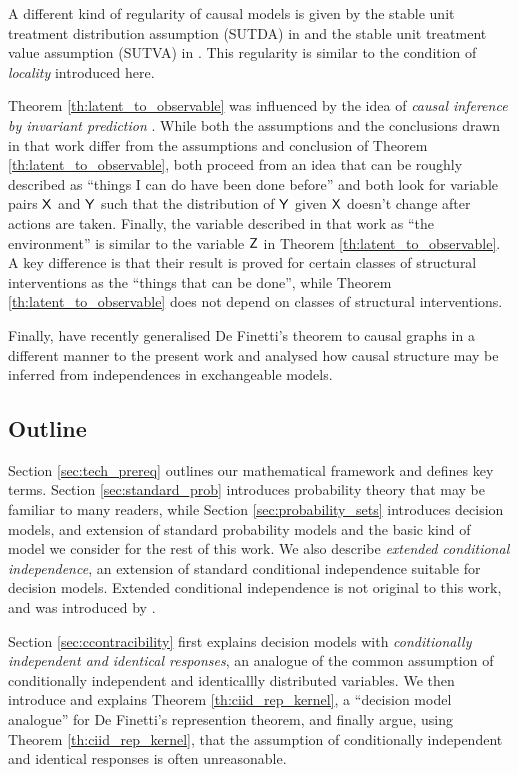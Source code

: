 \documentclass{article}
\begin{document}
A different kind of regularity of causal models is given by the stable unit treatment distribution assumption (SUTDA) in \citet{dawid_decision-theoretic_2020} and the stable unit treatment value assumption (SUTVA) in \citep{rubin_causal_2005}. This regularity is similar to the condition of \emph{locality} introduced here.

Theorem \ref{th:latent_to_observable} was influenced by the idea of \emph{causal inference by invariant prediction} \citep{peters_causal_2016}. While both the assumptions and the conclusions drawn in that work differ from the assumptions and conclusion of Theorem \ref{th:latent_to_observable}, both proceed from an idea that can be roughly described as ``things I can do have been done before'' and both look for variable pairs $\mathsf{X}$ and $\mathsf{Y}$ such that the distribution of $\mathsf{Y}$ given $\mathsf{X}$ doesn't change after actions are taken. Finally, the variable described in that work as ``the environment'' is similar to the variable $\mathsf{Z}$ in Theorem \ref{th:latent_to_observable}. A key difference is that their result is proved for certain classes of structural interventions as the ``things that can be done'', while Theorem \ref{th:latent_to_observable} does not depend on classes of structural interventions.

Finally, \citet{guoCausalFinettiIdentification2022} have recently generalised De Finetti's theorem to causal graphs in a different manner to the present work and analysed how causal structure may be inferred from independences in exchangeable models.

\subsection{Outline}

Section \ref{sec:tech_prereq} outlines our mathematical framework and defines key terms. Section \ref{sec:standard_prob} introduces probability theory that may be familiar to many readers, while Section \ref{sec:probability_sets} introduces decision models, and extension of standard probability models and the basic kind of model we consider for the rest of this work. We also describe \emph{extended conditional independence}, an extension of standard conditional independence suitable for decision models. Extended conditional independence is not original to this work, and was introduced by \citet{constantinou_extended_2017}.

Section \ref{sec:ccontracibility} first explains decision models with \emph{conditionally independent and identical responses}, an analogue of the common assumption of conditionally independent and identicallly distributed variables. We then introduce and explains Theorem \ref{th:ciid_rep_kernel}, a ``decision model analogue'' for De Finetti's represention theorem, and finally argue, using Theorem \ref{th:ciid_rep_kernel}, that the assumption of conditionally independent and identical responses is often unreasonable.
\end{document}
